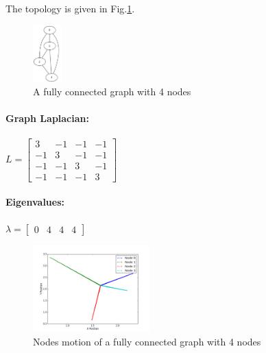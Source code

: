 \documentclass[12pt]{article}
\begin{document}
The topology is given in Fig.\ref{fig:C2}. 
\begin{figure}[htbp]
\centering
\includegraphics[width=0.1\textwidth]{./C2}
\caption{A fully connected graph with 4 nodes}
\label{fig:C2}
\end{figure}

\paragraph{\textbf{Graph Laplacian:}}

$
L = 
\begin{bmatrix}
3 & -1 & -1 & -1 \\
-1 & 3 & -1 & -1 \\
-1 & -1 & 3 & -1 \\
-1 & -1 & -1 & 3 
\end{bmatrix}
$

\paragraph{\textbf{Eigenvalues:}}

$
\lambda = 
\begin{bmatrix}
0 & 4 & 4 & 4
\end{bmatrix}
$

\begin{figure}[htbp]
\centering
\includegraphics[width=0.4\textwidth]{./C2_mo}
\caption{Nodes motion of a fully connected graph with 4 nodes}
\label{fig:C2_mo}
\end{figure}
\end{document}
